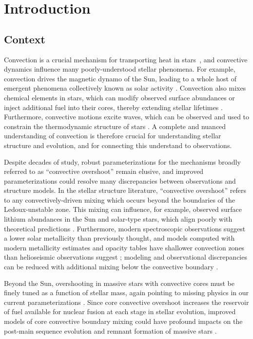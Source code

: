 \documentclass[twocolumn]{aastex631}
\begin{document}
\section{Introduction}
\label{sec:introduction}

\subsection{Context}
Convection is a crucial mechanism for transporting heat in stars~\citep{woosley_etal_2002, hansen_etal_2004, christensen-dalsgaard_2021}, and convective dynamics influence many poorly-understood stellar phenomena.
For example, convection drives the magnetic dynamo of the Sun, leading to a whole host of emergent phenomena collectively known as solar activity \citep{brun_browning_2017}.
Convection also mixes chemical elements in stars, which can modify observed surface abundances or inject additional fuel into their cores, thereby extending stellar lifetimes \citep{salaris_cassisi_2017}.
Furthermore, convective motions excite waves, which can be observed and used to constrain the thermodynamic structure of stars \citep{aerts2010, basu2016}.
A complete and nuanced understanding of convection is therefore crucial for understanding stellar structure and evolution, and for connecting this understand to observations.

Despite decades of study, robust parameterizations for the mechanisms broadly referred to as ``convective overshoot'' remain elusive, and improved parameterizations could resolve many discrepancies between observations and structure models.
In the stellar structure literature, ``convective overshoot'' refers to any convectively-driven mixing which occurs beyond the boundaries of the Ledoux-unstable zone.
This mixing can influence, for example, observed surface lithium abundances in the Sun and solar-type stars, which align poorly with theoretical predictions \citep{pinsonneault1997, carlos_etal_2019, dumont_etal_2021}.
Furthermore, modern spectroscopic observations suggest a lower solar metallicity than previously thought, and models computed with modern metallicity estimates and opacity tables have shallower convection zones than helioseismic observations suggest \citep{basu_antia_2004, bahcall_etal_2005, bergemann_serenelli_2014, vinyoles_etal_2017, asplund_etal_2021}; modeling and observational discrepancies can be reduced with additional mixing below the convective boundary \citep{christensen-dalsgaard_etal_2011}.

Beyond the Sun, overshooting in massive stars with convective cores must be finely tuned as a function of stellar mass, again pointing to missing physics in our current parameterizations \citep{claret_torres_2018, jermyn_etal_2018, viani_basu_2020, martinet_etal_2021, pedersen_etal_2021}.
Since core convective overshoot increases the reservoir of fuel available for nuclear fusion at each stage in stellar evolution, improved models of core convective boundary mixing could have profound impacts on the post-main sequence evolution and remnant formation of massive stars \citep{farmer_etal_2019, higgins_vink_2020}.
\end{document}
